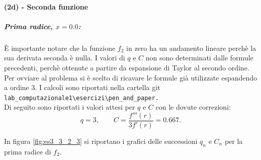 \documentclass[letterpaper, 12pt]{article}
\numberwithin{equation}{section}    %
\begin{document}
\paragraph{(2d) - Seconda funzione}
\subparagraph{Prima radice, $x = 0.0$:}
È importante notare che la funzione $f_2$ in zero ha un andamento lineare perchè la sua derivata seconda è 
nulla. I valori di $q$ e $C$ non sono determinati dalle formule precedenti, perchè ottenute
a partire da espansione di Taylor al secondo ordine. Per ovviare al problema 
si è scelto di ricavare le formule già utilizzate espandendo a ordine 3. I calcoli sono riportati nella 
cartella git
\verb|lab_computazionale1\esercizi\pen_and_paper.| \\
Di seguito sono riportati i valori attesi per $q$ e $C$ con le dovute correzioni:
\begin{equation*}
    q = 3,
    \qquad
    C = \frac{ f'''(r)}{3 f'(r)} = 0.667.
\end{equation*}

In figura \ref{fig:es3_3_2_3} si riportano i grafici delle successioni $q_n$ e $C_n$ per la prima radice di $f_2$.
\end{document}
